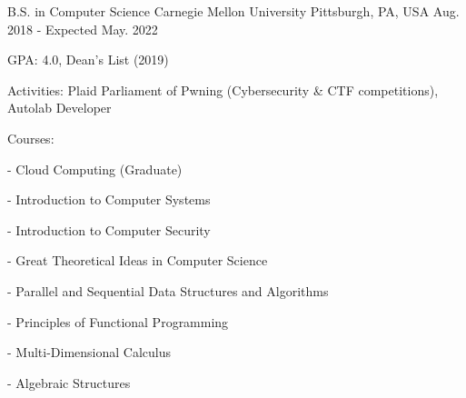 

\begin{cventries}

  \cventry
    {B.S. in Computer Science} %
    {Carnegie Mellon University} %
    {Pittsburgh, PA, USA} %
    {Aug. 2018 - Expected May. 2022} %
    {
      \begin{cvitems} %
      \item {GPA: 4.0, Dean's List (2019)}
      \item {Activities: Plaid Parliament of Pwning (Cybersecurity \& CTF competitions), Autolab Developer}
      \item {Courses:}
        \setlength\multicolsep{0pt}
        \begin{multicols}{3}
          \item[-] {Cloud Computing (Graduate)}
          \item[-] {Introduction to Computer Systems}
          \item[-] {Introduction to Computer Security}
          \item[-] {Great Theoretical Ideas in Computer Science}
          \item[-] {Parallel and Sequential Data Structures and Algorithms}
          \item[-] {Principles of Functional Programming}
          \item[-] {Multi-Dimensional Calculus}
          \item[-] {Algebraic Structures}
        \end{multicols}
      \end{cvitems}
    }
\end{cventries}
